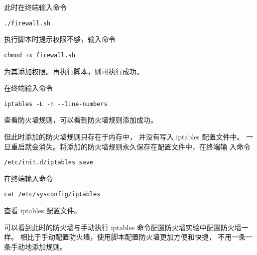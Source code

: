 此时在终端输入命令
\begin{verbatim}
./firewall.sh
\end{verbatim}
执行脚本时提示权限不够，输入命令
\begin{verbatim}
chmod +x firewall.sh
\end{verbatim}
为其添加权限。再执行脚本，则可执行成功。

在终端输入命令
\begin{verbatim}
iptables -L -n --line-numbers
\end{verbatim}
查看防火墙规则，可以看到防火墙规则添加成功。

但此时添加的防火墙规则只存在于内存中，
并没有写入 iptables 配置文件中。
一旦重启就会消失。将添加的防火墙规则永久保存在配置文件中，在终端输
入命令
\begin{verbatim}
/etc/init.d/iptables save
\end{verbatim}

在终端输入命令
\begin{verbatim}
cat /etc/sysconfig/iptables
\end{verbatim}
查看 iptables 配置文件。

可以看到此时的防火墙与手动执行 iptables
命令配置防火墙实验中配置防火墙一样。
相比于手动配置防火墙，使用脚本配置防火墙更加方便和快捷，
不用一条一条手动地添加规则。
